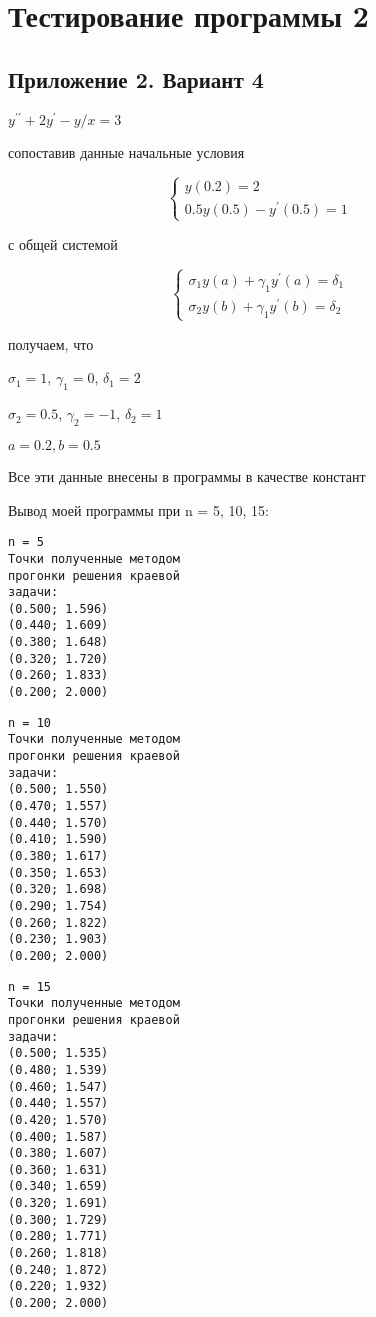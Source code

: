 \documentclass[a4paper,12pt,titlepage,finall]{article}
\begin{document}
\newpage
\section{Тестирование программы 2}
\subsection{Приложение 2. Вариант 4}

$y^{\prime\prime} + 2 y^{\prime} - y / x = 3$

сопоставив данные начальные условия


\begin{equation*}
 \begin{cases}
   y(0.2) = 2
   \\
   0.5 y(0.5) - y^{\prime}(0.5) = 1
 \end{cases}
\end{equation*}

с общей системой

\begin{equation*}
 \begin{cases}
   {\sigma}_1 y(a) + {\gamma}_1 y^{\prime}(a) = {\delta}_1
   \\
   {\sigma_2} y(b) + {\gamma}_1 y^{\prime}(b) = {\delta}_2
 \end{cases}
\end{equation*}

получаем, что 

${\sigma}_1 = 1$, ${\gamma}_1 = 0$, ${\delta}_1 = 2$


${\sigma}_2 = 0.5$, ${\gamma}_2 = -1$, ${\delta}_2 = 1$

$a = 0.2, b = 0.5$

Все эти данные внесены в программы в качестве констант

Вывод моей программы при n = 5, 10, 15:


\begin{multicols}{3}
\begin{verbatim}
n = 5
Точки полученные методом 
прогонки решения краевой 
задачи:
(0.500; 1.596)
(0.440; 1.609)
(0.380; 1.648)
(0.320; 1.720)
(0.260; 1.833)
(0.200; 2.000)
\end{verbatim}

\columnbreak
\begin{verbatim}
n = 10
Точки полученные методом 
прогонки решения краевой 
задачи:
(0.500; 1.550)
(0.470; 1.557)
(0.440; 1.570)
(0.410; 1.590)
(0.380; 1.617)
(0.350; 1.653)
(0.320; 1.698)
(0.290; 1.754)
(0.260; 1.822)
(0.230; 1.903)
(0.200; 2.000)
\end{verbatim}

\columnbreak
\begin{verbatim}
n = 15
Точки полученные методом 
прогонки решения краевой 
задачи:
(0.500; 1.535)
(0.480; 1.539)
(0.460; 1.547)
(0.440; 1.557)
(0.420; 1.570)
(0.400; 1.587)
(0.380; 1.607)
(0.360; 1.631)
(0.340; 1.659)
(0.320; 1.691)
(0.300; 1.729)
(0.280; 1.771)
(0.260; 1.818)
(0.240; 1.872)
(0.220; 1.932)
(0.200; 2.000)
\end{verbatim}

\end{multicols}
\end{document}
